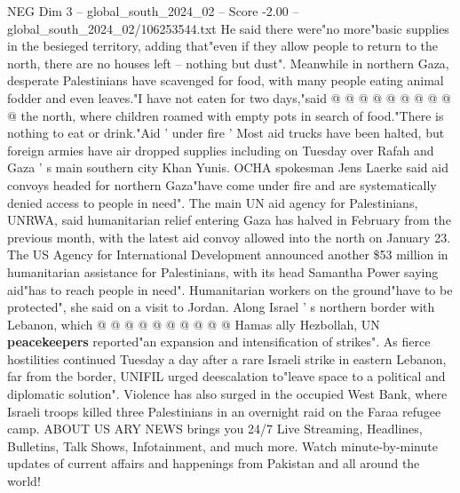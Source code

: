 \begin{textsample}{NEG Dim 3 – global\_south\_2024\_02 – Score -2.00 – global\_south\_2024\_02/106253544.txt}
He said there were"no more"basic supplies in the besieged territory, adding that"even if they allow people to return to the north, there are no houses left -- nothing but dust".
Meanwhile in northern Gaza, desperate Palestinians have scavenged for food, with many people eating animal fodder and even leaves."I have not eaten for two days,"said @ @ @ @ @ @ @ @ @ @ the north, where children roamed with empty pots in search of food."There is nothing to eat or drink."Aid ' under fire ' Most aid trucks have been halted, but foreign armies have air dropped supplies including on Tuesday over Rafah and Gaza ' s main southern city Khan Yunis.
OCHA spokesman Jens Laerke said aid convoys headed for northern Gaza"have come under fire and are systematically denied access to people in need".
The main UN aid agency for Palestinians, UNRWA, said humanitarian relief entering Gaza has halved in February from the previous month, with the latest aid convoy allowed into the north on January 23.
The US Agency for International Development announced another \$53 million in humanitarian assistance for Palestinians, with its head Samantha Power saying aid"has to reach people in need".
Humanitarian workers on the ground"have to be protected", she said on a visit to Jordan.
Along Israel ' s northern border with Lebanon, which @ @ @ @ @ @ @ @ @ @ Hamas ally Hezbollah, UN \textbf{peacekeepers} reported"an expansion and intensification of strikes".
As fierce hostilities continued Tuesday a day after a rare Israeli strike in eastern Lebanon, far from the border, UNIFIL urged deescalation to"leave space to a political and diplomatic solution".
Violence has also surged in the occupied West Bank, where Israeli troops killed three Palestinians in an overnight raid on the Faraa refugee camp.
ABOUT US ARY NEWS brings you 24/7 Live Streaming, Headlines, Bulletins, Talk Shows, Infotainment, and much more.
Watch minute-by-minute updates of current affairs and happenings from Pakistan and all around the world!

\end{textsample}
